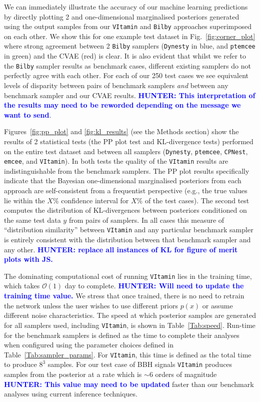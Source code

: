 \documentclass[%
showpacs,
nofootinbib,
 amsmath,amssymb,
 aps,
 twocolumn,
 prl,
 reprint,
floatfix,
]{revtex4-1}
\newcommand{\hunter}[1]{\textbf{\textcolor{blue}{HUNTER: #1}}}
\begin{document}
%
%
We can immediately illustrate the accuracy of our machine learning predictions
by directly plotting 2 and one-dimensional marginalised posteriors generated
using the output samples from our \texttt{VItamin} and \texttt{Bilby}
approaches superimposed on each other. We show this for one example test
dataset in Fig.~\ref{fig:corner_plot} where strong agreement between 2
\texttt{Bilby} samplers (\texttt{Dynesty} in blue, and \texttt{ptemcee} in green) and the
\ac{CVAE} (red) is clear. It is also evident that whilst we refer to the
\texttt{Bilby} sampler results as benchmark cases, different existing samplers
do not perfectly agree with each other. For each of our 250 test cases we see
equivalent levels of disparity between pairs of benchmark samplers \emph{and}
between any benchmark sampler and our \ac{CVAE} results.  \hunter{This interpretation 
of the results may need to be reworded depending on the message we want 
to send}.

%
%
Figures~\ref{fig:pp_plot} and \ref{fig:kl_results} (see the Methods section)
show the results of 2 statistical tests (the \ac{PP} plot test and
\ac{KL}-divergence tests) performed on the entire test dataset and between all
samplers (\texttt{Dynesty}, \texttt{ptemcee}, \texttt{CPNest}, \texttt{emcee}, and \texttt{VItamin}). In
both tests the quality of the \texttt{VItamin} results are indistinguishable from the
benchmark samplers. The \ac{PP} plot results specifically indicate that the
Bayesian one-dimensional marginalised posteriors from each approach are
self-consistent from a frequentist perspective (e.g., the true values lie
within the $X\%$ confidence interval for $X\%$ of the test cases). The second
test computes the distribution of \ac{KL}-divergences between posteriors
conditioned on the same test data $y$ from pairs of samplers. In all cases this
measure of ``distribution similarity'' between \texttt{VItamin} and any particular
benchmark sampler is entirely consistent with the distribution between that
benchmark sampler and any other.   \hunter{replace all instances of KL for 
figure of merit plots with JS.}

%
%
The dominating computational cost of running \texttt{VItamin} lies in the
training time, which takes $\mathcal{O}(1)$ day to complete. \hunter{Will need to update 
the training time value.} We
stress that once trained, there is no need to retrain the network unless the
user wishes to use different priors $p(x)$ or assume different noise
characteristics. The speed at which posterior samples are generated for all
samplers used, including \texttt{VItamin}, is shown in Table~\ref{Tab:speed}.
Run-time for the benchmark samplers is defined as the time to complete their
analyses when configured using the parameter choices defined in
Table~\ref{Tab:sampler_params}. For \texttt{VItamin}, this time is defined as
the total time to produce $8^3$ samples. For our test case of \ac{BBH} signals
\texttt{VItamin} produces samples from the posterior at a rate which is $\sim
6$ orders of magnitude \hunter{This value may need to be updated} faster than our benchmark analyses using current
inference techniques. 
\end{document}
